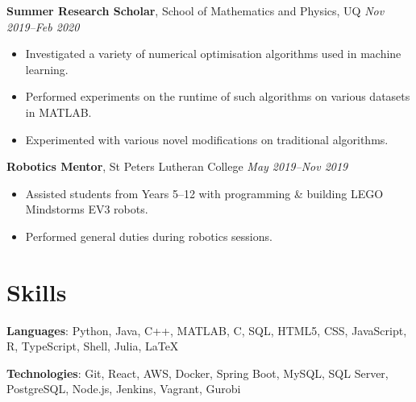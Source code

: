 \documentclass[9pt, a4paper]{extarticle}
\begin{document}
\textbf{Summer Research Scholar}, School of Mathematics and Physics, UQ \hfill \textit{Nov 2019--Feb 2020}
\begin{itemize}[label=\textcolor{gray!80}{\textbullet}]
    \item Investigated a variety of numerical optimisation algorithms used in machine learning.
    \item Performed experiments on the runtime of such algorithms on various datasets in MATLAB.
    \item Experimented with various novel modifications on traditional algorithms.
\end{itemize}

\textbf{Robotics Mentor}, St Peters Lutheran College \hfill \textit{May 2019--Nov 2019}
\begin{itemize}[label=\textcolor{gray!80}{\textbullet}]
    \item Assisted students from Years 5--12 with programming \& building LEGO Mindstorms EV3 robots.
    \item Performed general duties during robotics sessions.
\end{itemize}



\section*{Skills}
\textbf{Languages}: Python, Java, C++, MATLAB, C, SQL, HTML5, CSS, JavaScript, R, TypeScript, Shell, Julia, \LaTeX

\textbf{Technologies}: Git, React, AWS, Docker, Spring Boot, MySQL, SQL Server, PostgreSQL, Node.js, Jenkins, Vagrant, Gurobi
\end{document}
